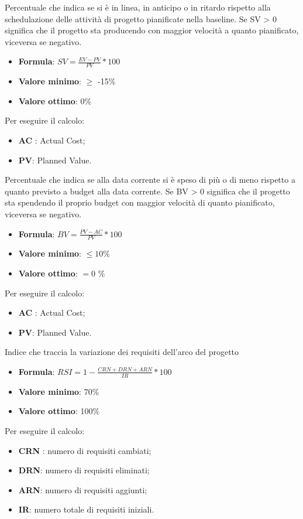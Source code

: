 Percentuale che indica se si è in linea, in anticipo o in ritardo rispetto alla schedulazione delle attività di progetto pianificate nella baseline. 
Se SV > 0 significa che il progetto sta producendo con maggior velocità a quanto pianificato, viceversa se negativo. 
\begin{itemize}
    \item \textbf{Formula}: $SV=\frac{EV-PV}{PV}*100$
    \item \textbf{Valore minimo}: $\geq$ -15\%
    \item \textbf{Valore ottimo}: 0\%
\end{itemize}  
Per eseguire il calcolo:
\begin{itemize}
    \item \textbf{AC} : Actual Cost;
    \item \textbf{PV}: Planned Value.
\end{itemize}

Percentuale che indica se alla data corrente si è speso di più o di meno rispetto a quanto previsto a budget alla data corrente. 
Se BV > 0 significa che il progetto sta spendendo il proprio budget con maggior velocità di quanto pianificato, viceversa se negativo.
\begin{itemize}
    \item \textbf{Formula}: $BV=\frac{PV-AC}{PV}*100$
    \item \textbf{Valore minimo}: $\leq10$\%
    \item \textbf{Valore ottimo}: $=0$ \%
\end{itemize}  
Per eseguire il calcolo:
\begin{itemize}
    \item \textbf{AC} : Actual Cost;
    \item \textbf{PV}: Planned Value.
\end{itemize}

Indice che traccia la variazione dei requisiti dell'arco del progetto
\begin{itemize}
    \item \textbf{Formula}: $RSI = 1 - \frac{CRN+DRN+ARN}{IR}*100$
    \item \textbf{Valore minimo}: 70\%
    \item \textbf{Valore ottimo}: 100\%
\end{itemize}  
Per eseguire il calcolo:
\begin{itemize}
    \item \textbf{CRN} : numero di requisiti cambiati;
    \item \textbf{DRN}: numero di requisiti eliminati;
    \item \textbf{ARN}: numero di requisiti aggiunti;
    \item \textbf{IR}: numero totale di requisiti iniziali.
\end{itemize}

